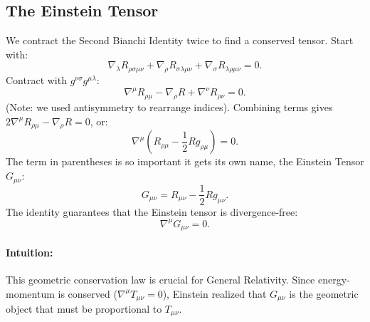 \documentclass[11pt, a4paper]{report}
\begin{document}
\subsection*{The Einstein Tensor}
We contract the Second Bianchi Identity twice to find a conserved tensor.
Start with:
\begin{equation}
\nabla_\lambda R_{\rho\sigma\mu\nu} + \nabla_\rho R_{\sigma\lambda\mu\nu} + \nabla_\sigma R_{\lambda\rho\mu\nu} = 0.
\end{equation}
Contract with \(g^{\nu\sigma} g^{\mu\lambda}\):
\begin{equation}
\nabla^\mu R_{\rho\mu} - \nabla_\rho R + \nabla^\nu R_{\rho\nu} = 0.
\end{equation}
(Note: we used antisymmetry to rearrange indices).
Combining terms gives \(2\nabla^\mu R_{\rho\mu} - \nabla_\rho R = 0\), or:
\begin{equation}
\nabla^\mu \left( R_{\rho\mu} - \frac{1}{2} R g_{\rho\mu} \right) = 0.
\end{equation}
The term in parentheses is so important it gets its own name, the Einstein Tensor \(G_{\mu\nu}\):
\begin{equation}
G_{\mu\nu} = R_{\mu\nu} - \frac{1}{2} R g_{\mu\nu}.
\end{equation}
The identity guarantees that the Einstein tensor is divergence-free:
\begin{equation}
\nabla^\mu G_{\mu\nu} = 0.
\end{equation}
\paragraph{Intuition:} This geometric conservation law is crucial for General Relativity. Since energy-momentum is conserved (\(\nabla^\mu T_{\mu\nu} = 0\)), Einstein realized that \(G_{\mu\nu}\) is the geometric object that must be proportional to \(T_{\mu\nu}\).
\end{document}
